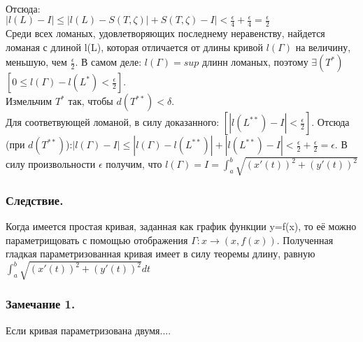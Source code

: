 \\
Отсюда:
\\
$|l(L)-I|\leqslant |l(L)-S(T,\zeta)|+S(T,\zeta)-I| < \frac{\epsilon}{4}+\frac{\epsilon}{4}=\frac{\epsilon}{2}$
\\
Среди всех ломаных, удовлетворяющих последнему неравенству, найдется ломаная с длиной l(L), которая отличается от длины кривой $l(\varGamma)$ на величину, меньшую, чем $\frac{\epsilon}{2}$.
В самом деле:
$l(\varGamma)=sup$ длинн ломаных, поэтому $\exists(T^*)$ $[0 \leqslant l(\varGamma)-l(L^*)<\frac{\epsilon}{2}]$.
\\
Измельчим $T^*$ так, чтобы $d(T^{**})<\delta$.
\\
Для соответвующей ломаной, в силу доказанного: $[|l(L^{**})-I|<\frac{\epsilon}{2}]$. Отсюда (при $d(T^{**})$):$|l(\varGamma)-I|\leqslant |l(\varGamma)-l(L^{**})|+|l(L^{**})-I|<\frac{\epsilon}{2}+\frac{\epsilon}{2}=\epsilon$.
В силу произвольности $\epsilon$ получим, что $l(\varGamma)=I=\int_{a}^{b}\sqrt{(x'(t))^2+(y'(t))^2}$
\dokno

\subsubsection{Следствие.}
Когда имеется простая кривая, заданная как график функции y=f(x), то её можно параметрищовать с помощью отображения $\varGamma:x \rightarrow(x,f(x))$. Полученная гладкая параметризованная кривая имеет в силу теоремы длину, равную $\int_{a}^{b}\sqrt{(x'(t))^2+(y'(t))^2}dt$

\subsubsection{Замечание 1.}
Если кривая параметризована двумя....